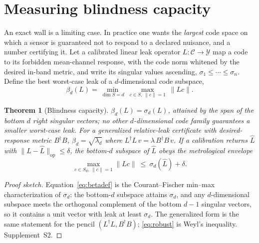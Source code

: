 \documentclass[10pt,twocolumn]{article}
\theoremstyle{plain}
\newtheorem{theorem}{Theorem}
\theoremstyle{definition}
\newcommand{\bd}{\beta}
\newcommand{\Lop}{L}
\newcommand{\Bmet}{B}
\begin{document}
\section{Measuring blindness capacity}\label{sec:capacity}
An exact wall is a limiting case. In practice one wants the \emph{largest} code
space on which a sensor is guaranteed not to respond to a declared nuisance, and a
number certifying it. Let a calibrated linear leak operator $\Lop:\mathcal C\to
\mathcal Y$ map a code to its forbidden mean-channel response, with the code norm
whitened by the desired in-band metric, and write its singular values ascending,
$\sigma_1\le\cdots\le\sigma_n$. Define the best worst-case leak of a $d$-dimensional
code subspace,
\begin{equation}
\bd_d(\Lop)=\min_{\dim S=d}\ \max_{c\in S,\ \lVert c\rVert=1}\ \lVert \Lop c\rVert .
\label{eq:betadef}
\end{equation}

\begin{theorem}[Blindness capacity]\label{thm:capacity}
$\bd_d(\Lop)=\sigma_d(\Lop)$, attained by the span of the bottom $d$ right singular
vectors; no other $d$-dimensional code family guarantees a smaller worst-case leak.
For a generalized relative-leak certificate with desired-response metric
$\Bmet^\dagger\Bmet$, $\bd_d=\sqrt{\lambda_d}$ where $\Lop^\dagger\Lop\,v=\lambda\,
\Bmet^\dagger\Bmet\,v$. If a calibration returns $\hat\Lop$ with
$\lVert \Lop-\hat\Lop\rVert_{\mathrm{op}}\le\delta$, the bottom-$d$ subspace of
$\hat\Lop$ obeys the metrological envelope
\begin{equation}
\max_{c\in S_d,\ \lVert c\rVert=1}\lVert \Lop c\rVert\ \le\ \sigma_d(\hat\Lop)+\delta .
\label{eq:robust}
\end{equation}
\end{theorem}

\begin{proof}[Proof sketch]
Equation~\eqref{eq:betadef} is the Courant--Fischer min--max characterization of
$\sigma_d$: the bottom-$d$ subspace attains $\sigma_d$, and any $d$-dimensional
subspace meets the orthogonal complement of the bottom $d-1$ singular vectors, so
it contains a unit vector with leak at least $\sigma_d$. The generalized form is
the same statement for the pencil $(\Lop^\dagger\Lop,\Bmet^\dagger\Bmet)$;
\eqref{eq:robust} is Weyl's inequality. Supplement~S2.
\end{proof}
\end{document}

